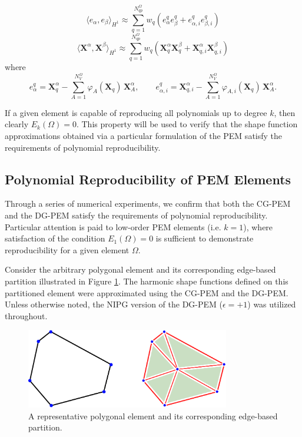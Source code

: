 \begin{equation}
        \langle e_\alpha, e_\beta \rangle_{H^1} \approx \sum_{q=1}^{N^{\Omega}_{qp}} w_q (e_{\alpha}^{q} e_{\beta}^{q} + e_{\alpha,i}^{q} e_{\beta,i}^{q})
\end{equation}
\begin{equation}
        \langle \mathbf{X}^\alpha, \mathbf{X}^\beta \rangle_{H^1} \approx \sum_{q=1}^{N^{\Omega}_{qp}} w_q (\mathbf{X}^{\alpha}_{q} \mathbf{X}^{\beta}_{q} + \mathbf{X}^{\alpha}_{q,i} \mathbf{X}^{\beta}_{q,i})
\end{equation}
where
\begin{equation}
        e_{\alpha}^{q} = \mathbf{X}^{\alpha}_{q} - \sum_{A = 1}^{N^{\Omega}_V} \varphi_A (\mathbf{X}_{q}) \, \mathbf{X}_A^{\alpha}, \qquad e_{\alpha,i}^{q} = \mathbf{X}^{\alpha}_{q,i} - \sum_{A = 1}^{N^{\Omega}_V} \varphi_{A,i} (\mathbf{X}_{q}) \, \mathbf{X}_A^{\alpha}.
\end{equation}

If a given element is capable of reproducing all polynomials up to degree $k$, then clearly $E_k(\Omega) = 0$. This property will be used to verify that the shape function approximations obtained via a particular formulation of the PEM satisfy the requirements of polynomial reproducibility.

\subsection*{Polynomial Reproducibility of PEM Elements}

Through a series of numerical experiments, we confirm that both the CG-PEM and the DG-PEM satisfy the requirements of polynomial reproducibility. Particular attention is paid to low-order PEM elements (i.e. $k=1$), where satisfaction of the condition $E_1 (\Omega) = 0$ is sufficient to demonstrate reproducibility for a given element $\Omega$.

Consider the arbitrary polygonal element and its corresponding edge-based partition illustrated in Figure \ref{fig:reproducing_element_shape}. The harmonic shape functions defined on this partitioned element were approximated using the CG-PEM and the DG-PEM. Unless otherwise noted, the NIPG version of the DG-PEM ($\epsilon = +1$) was utilized throughout.

\begin{figure}[!h]
  \centering
  \includegraphics[width=3.5in]{figures/reproducing_element_shape.pdf}  \caption{A representative polygonal element and its corresponding edge-based partition.}
  \label{fig:reproducing_element_shape}
\end{figure}


